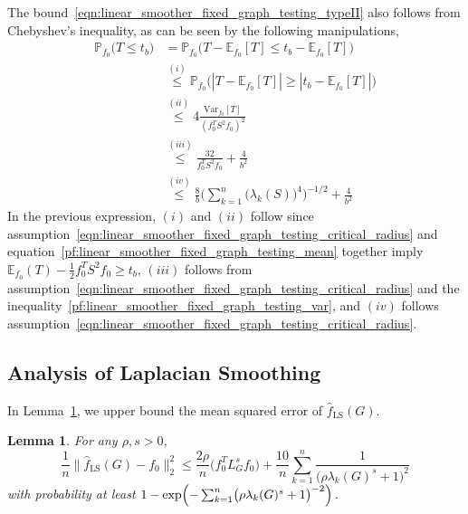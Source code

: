 \documentclass{article}
\newcommand{\abs}[1]{\left \lvert #1 \right \rvert}
\newcommand{\Var}{\mathrm{Var}}
\newcommand{\1}{\mathbf{1}}
\newcommand{\Lap}{L}
\newcommand{\Pbb}{\mathbb{P}}
\newcommand{\Ebb}{\mathbb{E}}
\newcommand{\wh}[1]{\widehat{#1}}
\newcommand{\LS}{\mathrm{LS}}
\theoremstyle{alden}
\theoremstyle{aldenthm}
\newtheorem{lemma}{Lemma}
\theoremstyle{definition}
\theoremstyle{remark}
\begin{document}
	The bound~\eqref{eqn:linear_smoother_fixed_graph_testing_typeII} also follows from Chebyshev's inequality, as can be seen by the following manipulations,
	\begin{equation*}
	\begin{aligned}
	\Pbb_{f_0}\bigl(T \leq t_b\bigr) & = \Pbb_{f_0}\bigl(T - \Ebb_{f_0}[T] \leq t_b - \Ebb_{f_0}[T]\bigr) \\
	& \overset{(i)}{\leq} \Pbb_{f_0}\bigl(\abs{T - \Ebb_{f_0}[T]} \geq \abs{t_b - \Ebb_{f_0}[T]}\bigr) \\ 
	& \overset{(ii)}{\leq} 4 \frac{\Var_{f_0}[T]}{(f_0^T S^2 f_0)^2} \\
	& \overset{(iii)}{\leq} \frac{32}{f_0^T S^2 f_0} + \frac{4}{b^2} \\
	& \overset{(iv)}{\leq} \frac{8}{b} \Biggl(\sum_{k = 1}^{n}\bigl(\lambda_k(S)\bigr)^4\Biggr)^{-1/2} + \frac{4}{b^2}
	\end{aligned}
	\end{equation*}
	In the previous expression, $(i)$ and $(ii)$ follow since assumption~\eqref{eqn:linear_smoother_fixed_graph_testing_critical_radius} and equation~\eqref{pf:linear_smoother_fixed_graph_testing_mean} together imply $\Ebb_{f_0}(T) - \frac{1}{2}f_0^T S^2f_0 \geq t_b$, $(iii)$ follows from assumption~\eqref{eqn:linear_smoother_fixed_graph_testing_critical_radius} and the inequality~\eqref{pf:linear_smoother_fixed_graph_testing_var}, and $(iv)$ follows assumption~\eqref{eqn:linear_smoother_fixed_graph_testing_critical_radius}. 

\subsection{Analysis of Laplacian Smoothing}
In Lemma~\ref{lem:ls_fixed_graph_estimation}, we upper bound the mean squared error of $\wh{f}_{\LS}(G)$.
\begin{lemma}
	\label{lem:ls_fixed_graph_estimation}
	For any $\rho,s > 0$,
	\begin{equation}
	\label{eqn:ls_fixed_graph_estimation_prob}
	\frac{1}{n}\bigl\|\wh{f}_{\LS}(G) - f_0\bigr\|_2^2 \leq \frac{2\rho}{n} \bigl(f_0^T \Lap_{G}^s f_0\bigr) + \frac{10}{n}\sum_{k = 1}^{n} \frac{1}{\bigl(\rho \lambda_{k}(G)^s + 1\bigr)^2}
	\end{equation}
	with probability at least $1 - \exp\Bigl(-\sum_{k = 1}^{n}\bigl(\rho \lambda_k(G)^s + 1\bigr)^{-2}\Bigr)$.
\end{lemma}
\end{document}
